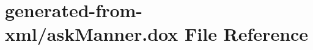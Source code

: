 \hypertarget{askManner_8dox}{}\section{generated-\/from-\/xml/ask\+Manner.dox File Reference}
\label{askManner_8dox}
